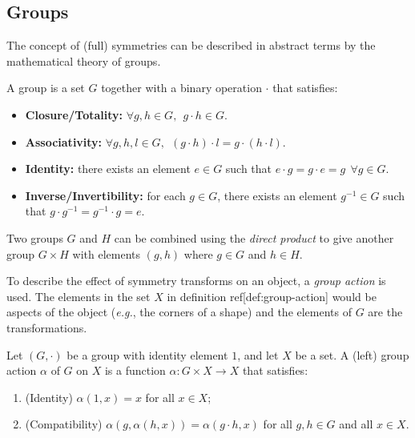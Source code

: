 \subsection{Groups}

The concept of (full) symmetries can be described in abstract terms by the mathematical theory of groups.

\begin{definition}[Group]
    A group is a set $G$ together with a binary operation $\cdot$ that satisfies:
    \begin{itemize}
        \item \textbf{Closure/Totality:} $\forall g,h \in G, \ \ g \cdot h \in G$.
        \item \textbf{Associativity:} $\forall g,h,l \in G, \ \ (g \cdot h) \cdot l = g \cdot (h \cdot l)$.
        \item \textbf{Identity:} there exists an element $e \in G$ such that $e \cdot g = g \cdot e = g \ \ \forall g \in G$.
        \item \textbf{Inverse/Invertibility:} for each $g \in G$, there exists an element $g^{-1} \in G$ such that $g \cdot g^{-1} = g^{-1} \cdot g = e$.
    \end{itemize}
\end{definition}

Two groups $G$ and $H$ can be combined using the \textit{direct product} to give another group $G \times H$ with elements $(g, h)$ where $g \in G$ and $h \in H$.

To describe the effect of symmetry transforms on an object, a \textit{group action} is used.
The elements in the set $X$ in definition ref[def:group-action] would be aspects of the object (\textit{e.g.}, the corners of a shape) and the elements of $G$ are the transformations.

\begin{definition}\label{def:group-action}
     Let $(G, \cdot)$ be a group with identity element $1$, and let $X$ be a set.
     A (left) group action $\alpha$ of $G$ on $X$ is a function $\alpha: G \times X \to X$ that satisfies:
     \begin{enumerate}
         \item (Identity) $\alpha(1, x) = x$ for all $x \in X$;
         \item (Compatibility) $\alpha(g, \alpha(h,x)) = \alpha(g \cdot h, x)$ for all $g,h \in G$ and all $x \in X$.
     \end{enumerate}
\end{definition}

